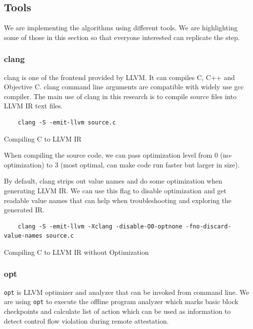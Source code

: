 \subsection{Tools}

We are implementing the algorithms using different tools. We are highlighting some of those in this section so that everyone interested can replicate the step.

\subsubsection{clang}

clang is one of the frontend provided by LLVM. It can compiles C, C++ and Objective C. clang command line arguments are compatible with widely use gcc compiler. The main use of clang in this research is to compile source files into LLVM IR text files.

\begin{listing}
\begin{verbatim}
    clang -S -emit-llvm source.c
\end{verbatim}
\caption{Compiling C to LLVM IR}    
\label{listing:2-7}
\end{listing}
    
When compiling the source code, we can pass optimization level from 0 (no-optimization) to 3 (most optimal, can make code run faster but larger in size).  

By default, clang strips out value names and do some optimization when generating LLVM IR. We can use this flag to disable optimization and get readable value names that can help when troubleshooting and exploring the generated IR.

\begin{listing}
\begin{verbatim}
    clang -S -emit-llvm -Xclang -disable-O0-optnone -fno-discard-value-names source.c
\end{verbatim}
\caption{Compiling C to LLVM IR without Optimization}    
\label{listing:2-8}
\end{listing}

\subsubsection{opt}

\texttt{opt} is LLVM optimizer and analyzer that can be invoked from command line. We are using \texttt{opt} to execute the offline program analyzer which marks basic block checkpoints and calculate list of action which can be used as information to detect control flow violation during remote attestation.

